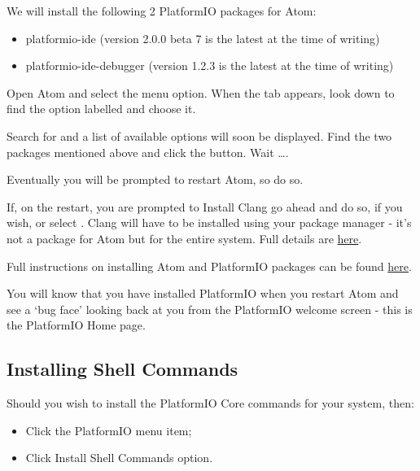 We will install the following 2 PlatformIO packages for Atom:

\begin{itemize}
\item
  platformio-ide (version 2.0.0 beta 7 is the latest at the time of
  writing)
\item
  platformio-ide-debugger (version 1.2.3 is the latest at the time of
  writing)
\end{itemize}

Open Atom and select the  menu option.
When the  tab appears, look down to find the option labelled
 and choose it.

Search for  and a list of available options will soon be
displayed. Find the two packages mentioned above and click the 
button. Wait \ldots{}.

Eventually you will be prompted to restart Atom, so do so.

If, on the restart, you are prompted to Install Clang go ahead and do
so, if you wish, or select . Clang
will have to be installed using your package manager - it's not a
package for Atom but for the entire system. Full details are
\href{http://docs.platformio.org/en/latest/ide/atom.html\#ii-clang-for-intelligent-code-completion}{here}.

Full instructions on installing Atom and PlatformIO packages can be
found
\href{http://docs.platformio.org/en/latest/ide/atom.html\#clang-for-intelligent-code-completion}{here}.

You will know that you have installed PlatformIO when you restart Atom
and see a `bug face' looking back at you from the PlatformIO welcome
screen - this is the PlatformIO Home page.

\subsection{Installing Shell Commands}\label{installing-shell-commands}

Should you wish to install the PlatformIO Core commands for your system, then:

\begin{itemize}
	\item Click the PlatformIO menu item;
	\item Click Install Shell Commands option.
\end{itemize}


